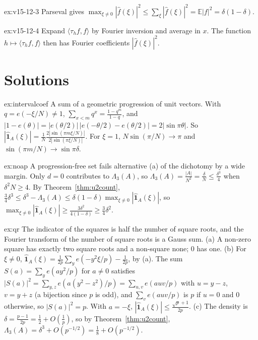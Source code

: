\begin{hint}{ex:v15-12-3}
Parseval gives \(\max_{\xi\ne0}|\hat f(\xi)|^2\le\sum_\xi|\hat f(\xi)|^2=\mathbb E|f|^2=\delta(1-\delta)\).
\end{hint}

\begin{hint}{ex:v15-12-4}
Expand \(\langle\tau_hf,f\rangle\) by Fourier inversion and average in \(x\). The function \(h\mapsto\langle\tau_hf,f\rangle\) then has Fourier coefficients \(|\hat f(\xi)|^2\).
\end{hint}

\section{Solutions}

\begin{solution}{ex:intervalcoef}
\idea A sum of a geometric progression of unit vectors.
\writeup With $q=e(-\xi/N)\ne1$, $\sum_{x<m}q^x=\frac{1-q^m}{1-q}$, and $|1-e(\theta)|=|e(\theta/2)|\,|e(-\theta/2)-e(\theta/2)|=2|\sin\pi\theta|$. So $|\hat{\mathbf 1}_A(\xi)|=\frac1N\frac{2|\sin(\pi m\xi/N)|}{2|\sin(\pi\xi/N)|}$. For $\xi=1$, $N\sin(\pi/N)\to\pi$ and $\sin(\pi m/N)\to\sin\pi\delta$.
\end{solution}

\begin{solution}{ex:noap}
\idea A progression-free set fails alternative (a) of the dichotomy by a wide margin.
\writeup Only $d=0$ contributes to $\Lambda_3(A)$, so $\Lambda_3(A)=\frac{|A|}{N^2}=\frac\delta N\le\frac{\delta^3}4$ when $\delta^2N\ge4$. By Theorem~\ref{thm:u2count}, $\frac34\delta^3\le\delta^3-\Lambda_3(A)\le\delta(1-\delta)\max_{\xi\ne0}|\hat{\mathbf 1}_A(\xi)|$, so $\max_{\xi\ne0}|\hat{\mathbf 1}_A(\xi)|\ge\frac{3\delta^2}{4(1-\delta)}\ge\frac34\delta^2$.
\end{solution}

\begin{solution}{ex:qr}
\idea The indicator of the squares is half the number of square roots, and the Fourier transform of the number of square roots is a Gauss sum.
\writeup (a) A non-zero square has exactly two square roots and a non-square none; $0$ has one. (b) For $\xi\ne0$, $\hat{\mathbf 1}_A(\xi)=\frac1{2p}\sum_ye(-y^2\xi/p)-\frac1{2p}$, by (a). The sum $S(a)=\sum_ye(ay^2/p)$ for $a\ne0$ satisfies $|S(a)|^2=\sum_{y,z}e(a(y^2-z^2)/p)=\sum_{u,v}e(auv/p)$ with $u=y-z$, $v=y+z$ (a bijection since $p$ is odd), and $\sum_ve(auv/p)$ is $p$ if $u=0$ and $0$ otherwise, so $|S(a)|^2=p$. With $a=-\xi$, $|\hat{\mathbf 1}_A(\xi)|\le\frac{\sqrt p+1}{2p}$. (c) The density is $\delta=\frac{p-1}{2p}=\frac12+O(\frac1p)$, so by Theorem~\ref{thm:u2count}, $\Lambda_3(A)=\delta^3+O(p^{-1/2})=\frac18+O(p^{-1/2})$.
\end{solution}

